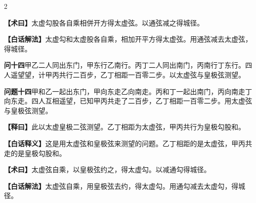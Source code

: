 \documentclass[11pt,a4paper]{article}
\newcommand{\WenQuestion}[1]{\textbf{\textcolor{classicalcolor}{#1}}}
\newcommand{\BaiQuestion}[1]{\textbf{\textcolor{moderncolor}{#1}}}
\newcommand{\WenExplain}{\textcolor{classicalcolor}{\textbf{【释曰】}}}
\newcommand{\BaiExplain}{\textcolor{moderncolor}{\textbf{【白话释义】}}}
\newcommand{\WenMethod}{\textcolor{classicalcolor}{\textbf{【术曰】}}}
\newcommand{\BaiMethod}{\textcolor{moderncolor}{\textbf{【白话解法】}}}
\begin{document}
\begin{paracol}{2}
\switchcolumn*
\begin{tcolorbox}[colback=red!5,colframe=red!40!black,boxrule=0.3pt]
\WenMethod\quad 太虚勾股各自乘相併开方得太虚弦。以通弦减之得城径。
\end{tcolorbox}
\switchcolumn
\begin{tcolorbox}[colback=blue!5,colframe=blue!40!black,boxrule=0.3pt]
\BaiMethod\quad 太虚勾和太虚股各自乘，相加开平方得太虚弦。用通弦减去太虚弦，得城径。
\end{tcolorbox}

\vspace{0.8em}

\switchcolumn*
\begin{tcolorbox}[colback=red!3,colframe=red!30!black,boxrule=0.3pt]
\WenQuestion{问十四}\quad 甲乙二人同出东门，甲东行乙南行。丙丁二人同出南门，丙南行丁东行。四人遥望望，计甲丙共行二百步，乙丁相距一百零二步。以太虚弦与皇极弦测望。
\end{tcolorbox}
\switchcolumn
\begin{tcolorbox}[colback=blue!3,colframe=blue!30!black,boxrule=0.3pt]
\BaiQuestion{问题十四}\quad 甲和乙一起出东门，甲向东走乙向南走。丙和丁一起出南门，丙向南走丁向东走。四人互相遥望，已知甲丙共走了二百步，乙丁相距一百零二步。用太虚弦与皇极弦测望。
\end{tcolorbox}

\switchcolumn*
\begin{tcolorbox}[colback=red!5,colframe=red!30!black,boxrule=0.3pt]
\WenExplain\quad 此以太虚皇极二弦测望。乙丁相距为太虚弦，甲丙共行为皇极勾股和。
\end{tcolorbox}
\switchcolumn
\begin{tcolorbox}[colback=blue!5,colframe=blue!30!black,boxrule=0.3pt]
\BaiExplain\quad 这是用太虚弦和皇极弦来测望的问题。乙丁相距的是太虚弦，甲丙共走的是皇极勾股和。
\end{tcolorbox}

\switchcolumn*
\begin{tcolorbox}[colback=red!5,colframe=red!40!black,boxrule=0.3pt]
\WenMethod\quad 太虚弦自乘，以皇极弦约之，得太虚勾。以减通勾得城径。
\end{tcolorbox}
\switchcolumn
\begin{tcolorbox}[colback=blue!5,colframe=blue!40!black,boxrule=0.3pt]
\BaiMethod\quad 太虚弦自乘，用皇极弦去约，得太虚勾。用通勾减去太虚勾，得城径。
\end{tcolorbox}

\end{paracol}
\end{document}
